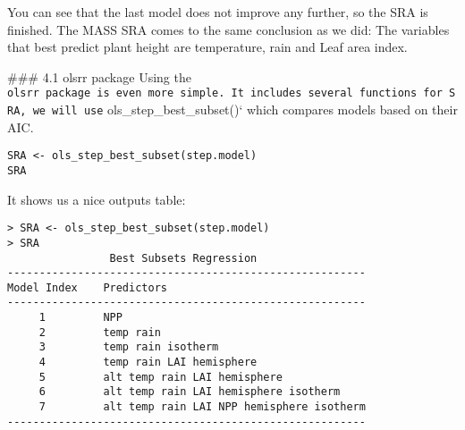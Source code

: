 \documentclass[
]{article}
\begin{document}
You can see that the last model does not improve any further, so the SRA
is finished. The MASS SRA comes to the same conclusion as we did: The
variables that best predict plant height are temperature, rain and Leaf
area index.

\#\#\# 4.1 olsrr package Using the
\texttt{olsrr\ package\ is\ even\ more\ simple.\ It\ includes\ several\ functions\ for\ SRA,\ we\ will\ use}
ols\_step\_best\_subset()` which compares models based on their AIC.

\begin{verbatim}
SRA <- ols_step_best_subset(step.model)
SRA
\end{verbatim}

It shows us a nice outputs table:

\begin{verbatim}
> SRA <- ols_step_best_subset(step.model)
> SRA
                Best Subsets Regression                 
--------------------------------------------------------
Model Index    Predictors
--------------------------------------------------------
     1         NPP                                       
     2         temp rain                                 
     3         temp rain isotherm                        
     4         temp rain LAI hemisphere                  
     5         alt temp rain LAI hemisphere              
     6         alt temp rain LAI hemisphere isotherm     
     7         alt temp rain LAI NPP hemisphere isotherm 
--------------------------------------------------------


\end{verbatim}
\end{document}
